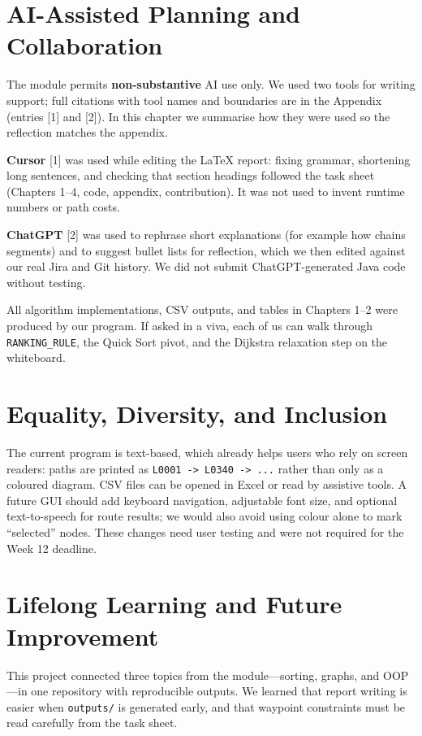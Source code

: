 \documentclass[12pt,a4paper,twocolumn,openany]{report}
\newcommand{\p}[1]{\path{#1}}
\begin{document}
\section{AI-Assisted Planning and Collaboration}
The module permits \textbf{non-substantive} AI use only. 
We used two tools for writing support; full citations with tool names and boundaries are in the Appendix (entries [1] and [2]). 
In this chapter we summarise how they were used so the reflection matches the appendix.

\textbf{Cursor} [1] was used while editing the LaTeX report: fixing grammar, shortening long sentences, and checking that section headings followed the task sheet (Chapters 1--4, code, appendix, contribution). 
It was not used to invent runtime numbers or path costs.

\textbf{ChatGPT} [2] was used to rephrase short explanations (for example how \p{GraphQueryService} chains segments) and to suggest bullet lists for reflection, which we then edited against our real Jira and Git history. 
We did not submit ChatGPT-generated Java code without testing.

All algorithm implementations, CSV outputs, and tables in Chapters 1--2 were produced by our program. 
If asked in a viva, each of us can walk through \texttt{RANKING\_RULE}, the Quick Sort pivot, and the Dijkstra relaxation step on the whiteboard.

\section{Equality, Diversity, and Inclusion}
The current program is text-based, which already helps users who rely on screen readers: paths are printed as \texttt{L0001 -> L0340 -> ...} rather than only as a coloured diagram. 
CSV files can be opened in Excel or read by assistive tools. 
A future GUI should add keyboard navigation, adjustable font size, and optional text-to-speech for route results; we would also avoid using colour alone to mark ``selected'' nodes. 
These changes need user testing and were not required for the Week 12 deadline.

\section{Lifelong Learning and Future Improvement}
This project connected three topics from the module---sorting, graphs, and OOP---in one repository with reproducible outputs. 
We learned that report writing is easier when \texttt{outputs/} is generated early, and that waypoint constraints must be read carefully from the task sheet.
\end{document}

